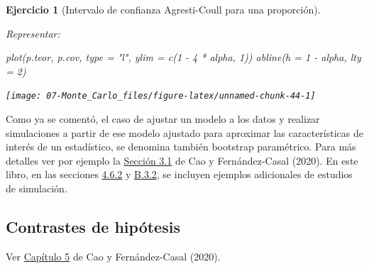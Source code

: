\documentclass[
]{book}
\newenvironment{Shaded}{\begin{snugshade}}{\end{snugshade}}
\newcommand{\AttributeTok}[1]{\textcolor[rgb]{0.77,0.63,0.00}{#1}}
\newcommand{\DecValTok}[1]{\textcolor[rgb]{0.00,0.00,0.81}{#1}}
\newcommand{\FunctionTok}[1]{\textcolor[rgb]{0.00,0.00,0.00}{#1}}
\newcommand{\NormalTok}[1]{#1}
\newcommand{\SpecialCharTok}[1]{\textcolor[rgb]{0.00,0.00,0.00}{#1}}
\newcommand{\StringTok}[1]{\textcolor[rgb]{0.31,0.60,0.02}{#1}}
\theoremstyle{break}
\newtheorem{exercise}{Ejercicio}[chapter]
\theoremstyle{nonumberplain}
\begin{document}
\begin{exercise}[Intervalo de confianza Agresti-Coull para una proporción]
\begin{enumerate}
  Representar:

\begin{Shaded}
\begin{Highlighting}[]
\FunctionTok{plot}\NormalTok{(p.teor, p.cov, }\AttributeTok{type =} \StringTok{"l"}\NormalTok{, }\AttributeTok{ylim =} \FunctionTok{c}\NormalTok{(}\DecValTok{1} \SpecialCharTok{{-}} \DecValTok{4} \SpecialCharTok{*}\NormalTok{ alpha, }\DecValTok{1}\NormalTok{))}
\FunctionTok{abline}\NormalTok{(}\AttributeTok{h =} \DecValTok{1} \SpecialCharTok{{-}}\NormalTok{ alpha, }\AttributeTok{lty =} \DecValTok{2}\NormalTok{) }
\end{Highlighting}
\end{Shaded}

  \begin{center}\texttt{[image: 07-Monte\_Carlo\_files/figure-latex/unnamed-chunk-44-1]} \end{center}
\end{enumerate}

\end{exercise}

Como ya se comentó, el caso de ajustar un modelo a los datos y realizar simulaciones a partir de ese modelo ajustado para aproximar las características de interés de un estadístico, se denomina también bootstrap paramétrico.
Para más detalles ver por ejemplo la \href{https://rubenfcasal.github.io/book_remuestreo/modunif-boot-par.html}{Sección 3.1} de Cao y Fernández-Casal (2020).
En este libro, en las secciones \href{https://rubenfcasal.github.io/book_remuestreo/icboot-ejem.html\#estudio-sim-exp}{4.6.2} y \href{https://rubenfcasal.github.io/book_remuestreo/ejemplos-3.html\#estudio-sim-boot}{B.3.2}, se incluyen ejemplos adicionales de estudios de simulación.

\hypertarget{contrastes}{%
\subsection{Contrastes de hipótesis}\label{contrastes}}

Ver \href{https://rubenfcasal.github.io/book_remuestreo/contrastes.html}{Capítulo 5} de Cao y Fernández-Casal (2020).
\end{document}
